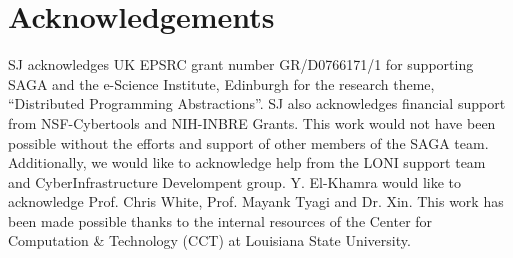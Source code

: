 \documentclass[conference,final]{IEEEtran}
\begin{document}
\section{Acknowledgements}
SJ acknowledges UK EPSRC grant number GR/D0766171/1 for supporting
SAGA and the e-Science Institute, Edinburgh for the research theme,
``Distributed Programming Abstractions''.  SJ also acknowledges
financial support from NSF-Cybertools and NIH-INBRE Grants. This work
would not have been possible without the efforts and support of other
members of the SAGA team.  Additionally, we would like to acknowledge
help from the LONI support team and CyberInfrastructure Develompent
group. Y. El-Khamra would like to acknowledge Prof. Chris White,
Prof. Mayank Tyagi and Dr. Xin. This work has been made possible
thanks to the internal resources of the Center for Computation \&
Technology (CCT) at Louisiana State University.


\end{document}
